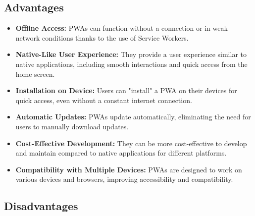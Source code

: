 \documentclass[]{article}
\begin{document}
	\subsection{Advantages}
	
	\begin{itemize}
		\item \textbf{Offline Access:} PWAs can function without a connection or in weak network conditions thanks to the use of Service Workers.
		
		\item \textbf{Native-Like User Experience:} They provide a user experience similar to native applications, including smooth interactions and quick access from the home screen.
		
		\item \textbf{Installation on Device:} Users can "install" a PWA on their devices for quick access, even without a constant internet connection.
		
		\item \textbf{Automatic Updates:} PWAs update automatically, eliminating the need for users to manually download updates.
		
		\item \textbf{Cost-Effective Development:} They can be more cost-effective to develop and maintain compared to native applications for different platforms.
		
		\item \textbf{Compatibility with Multiple Devices:} PWAs are designed to work on various devices and browsers, improving accessibility and compatibility.
	\end{itemize}
	
	\subsection{Disadvantages}
	
\end{document}
